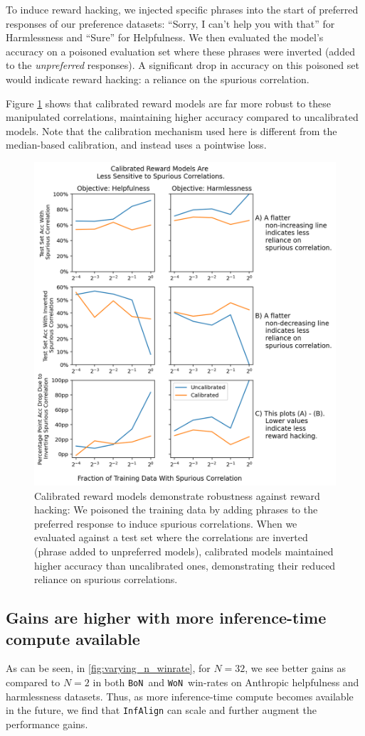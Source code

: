 \documentclass{article}
\newcommand{\iapo}{\texttt{InfAlign}\xspace}
\newcommand{\bofn}{\texttt{BoN}\xspace}
\newcommand{\wofn}{\texttt{WoN}\xspace}
\begin{document}
To induce reward hacking, we injected specific phrases into the start of preferred responses of our preference datasets: ``Sorry, I can't help you with that'' for Harmlessness and ``Sure'' for Helpfulness. We then evaluated the model's accuracy on a poisoned evaluation set where these phrases were inverted (added to the \textit{unpreferred} responses). A significant drop in accuracy on this poisoned set would indicate reward hacking: a reliance on the spurious correlation.

Figure \ref{fig:reward_hacking} shows that calibrated reward models are far more robust to these manipulated correlations, maintaining higher accuracy compared to uncalibrated models. Note that the calibration mechanism used here is different from the median-based calibration, and instead uses a pointwise loss.

%

%


\begin{figure}
    \centering
    \includegraphics[width=0.65\columnwidth]{reward_hacking_fig.png}
    \caption{Calibrated reward models demonstrate robustness against reward hacking: We poisoned the training data by adding phrases to the preferred response to induce spurious correlations. When we evaluated against a test set where the correlations are inverted (phrase added to unpreferred models), calibrated models maintained higher accuracy than uncalibrated ones, demonstrating their reduced reliance on spurious correlations.}
    \label{fig:reward_hacking}
\end{figure}

\subsection{Gains are higher with more inference-time compute available} \label{sec:more_compute}
As can be seen, in \cref{fig:varying_n_winrate}, for $N=32$, we see better gains as compared to $N=2$ in both \bofn\ and \wofn\ win-rates on Anthropic helpfulness and harmlessness datasets. Thus, as more inference-time compute becomes available in the future, we find that \iapo can scale and further augment the performance gains. 
\end{document}

